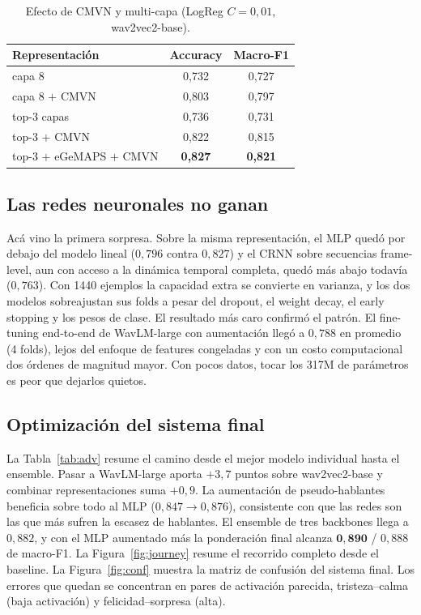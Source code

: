 \documentclass[conference]{IEEEtran}
\begin{document}
\begin{table}[t]
\caption{Efecto de CMVN y multi-capa (LogReg $C{=}0{,}01$, wav2vec2-base).}
\label{tab:cmvn}
\centering
\begin{tabular}{lcc}
\toprule
Representación & Accuracy & Macro-F1 \\
\midrule
capa 8 & 0,732 & 0,727 \\
capa 8 $+$ CMVN & 0,803 & 0,797 \\
top-3 capas & 0,736 & 0,731 \\
top-3 $+$ CMVN & 0,822 & 0,815 \\
top-3 $+$ eGeMAPS $+$ CMVN & \textbf{0,827} & \textbf{0,821} \\
\bottomrule
\end{tabular}
\end{table}

\subsection{Las redes neuronales no ganan}

Acá vino la primera sorpresa. Sobre la misma representación, el MLP quedó
por debajo del modelo lineal ($0{,}796$ contra $0{,}827$) y el CRNN sobre
secuencias frame-level, aun con acceso a la dinámica temporal completa,
quedó más abajo todavía ($0{,}763$). Con 1440 ejemplos la capacidad extra se
convierte en varianza, y los dos modelos sobreajustan sus folds a pesar del
dropout, el weight decay, el early stopping y los pesos de clase. El
resultado más caro confirmó el patrón. El fine-tuning end-to-end de
WavLM-large con aumentación llegó a $0{,}788$ en promedio (4 folds), lejos
del enfoque de features congeladas y con un costo computacional dos órdenes
de magnitud mayor. Con pocos datos, tocar los 317M de parámetros es peor que
dejarlos quietos.

\subsection{Optimización del sistema final}

La Tabla~\ref{tab:adv} resume el camino desde el mejor modelo individual
hasta el ensemble. Pasar a WavLM-large aporta $+3{,}7$ puntos sobre
wav2vec2-base y combinar representaciones suma $+0{,}9$. La aumentación de
pseudo-hablantes beneficia sobre todo al MLP ($0{,}847 \rightarrow 0{,}876$),
consistente con que las redes son las que más sufren la escasez de
hablantes. El ensemble de tres backbones llega a $0{,}882$, y con el MLP
aumentado más la ponderación final alcanza $\mathbf{0{,}890}$ / $0{,}888$ de
macro-F1. La Figura~\ref{fig:journey} resume el recorrido completo desde el
baseline. La Figura~\ref{fig:conf} muestra la matriz de confusión del
sistema final. Los errores que quedan se concentran en pares de activación
parecida, tristeza--calma (baja activación) y felicidad--sorpresa (alta).
\end{document}
